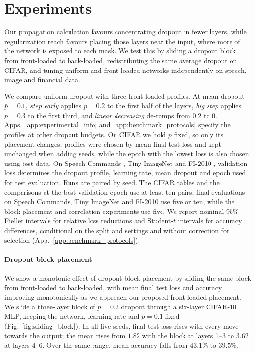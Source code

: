 \section{Experiments}
\label{sec:experiments}



Our propagation calculation favours concentrating dropout in fewer layers, while regularization reach favours placing those layers near the input, where more of the network is exposed to each mask. We test this by sliding a dropout block from front-loaded to back-loaded, redistributing the same average dropout on CIFAR, and tuning uniform and front-loaded networks independently on speech, image and financial data.

We compare uniform dropout with three front-loaded profiles. At mean dropout $\bar p=0.1$, \emph{step early} applies $p=0.2$ to the first half of the layers, \emph{big step} applies $p=0.3$ to the first third, and \emph{linear decreasing} de-ramps from $0.2$ to $0$. Apps.~\ref{app:experimental_info} and~\ref{app:benchmark_protocols} specify the profiles at other dropout budgets. On CIFAR we hold $\bar p$ fixed, so only its placement changes; profiles were chosen by mean final test loss and kept unchanged when adding seeds, while the epoch with the lowest loss is also chosen using test data. On Speech Commands \cite{warden2018speechcommands}, Tiny ImageNet \cite{le2015tinyimagenet} and FI-2010 \cite{ntakaris2018benchmark}, validation loss determines the dropout profile, learning rate, mean dropout and epoch used for test evaluation. Runs are paired by seed. The CIFAR tables and the comparisons at the best validation epoch use at least ten pairs; final evaluations on Speech Commands, Tiny ImageNet and FI-2010 use five or ten, while the block-placement and correlation experiments use five. We report nominal $95\%$ Fieller intervals for relative loss reductions \cite{fieller1954interval} and Student-$t$ intervals for accuracy differences, conditional on the split and settings and without correction for selection (App.~\ref{app:benchmark_protocols}).

\paragraph{Dropout block placement}
We show a monotonic effect of dropout-block placement by sliding the same block from front-loaded to back-loaded, with mean final test loss and accuracy improving monotonically as we approach our proposed front-loaded placement. We slide a three-layer block of $p=0.2$ dropout through a six-layer CIFAR-10 MLP, keeping the network, learning rate and $\bar p=0.1$ fixed (Fig.~\ref{fig:sliding_block}). In all five seeds, final test loss rises with every move towards the output; the mean rises from $1.82$ with the block at layers 1--3 to $3.62$ at layers 4--6. Over the same range, mean accuracy falls from $43.1\%$ to $39.5\%$.


